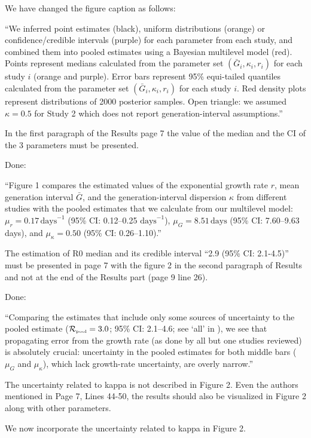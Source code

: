 \documentclass[12pt]{article}
\newcommand{\Rpool}{\ensuremath{{\mathcal R}_{\textrm{\tiny{pool}}}}\xspace}
\newcommand{\revtext}{\textsf}
\begin{document}
We have changed the figure caption as follows:

``We inferred point estimates (black), uniform distributions (orange) or confidence/credible intervals (purple) for each parameter from each study, and combined them into pooled estimates using a Bayesian multilevel model (red).
Points represent medians calculated from the parameter set $(\bar{G}_{i}, \kappa_{i}, r_{i})$ for each study $i$ (orange and purple).
Error bars represent 95\% equi-tailed quantiles calculated from the parameter set $(\bar{G}_{i}, \kappa_{i}, r_{i})$ for each study $i$.
Red density plots represent distributions of 2000 posterior samples.
Open triangle: we assumed $\kappa=0.5$ for Study 2 which does not report generation-interval assumptions.''

\revtext{In the first paragraph of the Results page 7 the value of the median and the CI of the 3
parameters must be presented.}

Done:

``Figure 1 compares the estimated values of the exponential growth rate $r$, mean generation interval $\bar G$, and the generation-interval dispersion $\kappa$ from different studies with the pooled estimates that we calculate from our multilevel model:
$\mu_r = 0.17\,\textrm{days}^{-1}$ (95\% CI: 0.12--0.25 $\textrm{days}^{-1}$),
$\mu_G = 8.51\,\textrm{days}$ (95\% CI: 7.60--9.63 days),
and
$\mu_\kappa = 0.50$ (95\% CI: 0.26--1.10).''

\revtext{The estimation of R0 median and its credible interval “2.9 (95\% CI: 2.1-4.5)” must be presented
in page 7 with the figure 2 in the second paragraph of Results and not at the end of the Results
part (page 9 line 26).}

Done:

``Comparing the estimates that include only some sources of uncertainty to the pooled estimate ($\Rpool = 3.0$; 95\% CI: 2.1--4.6; see `all' in ), we see that propagating error from the growth rate (as done by all but one studies reviewed) is absolutely crucial: uncertainty in the pooled estimates for both middle bars ($\mu_G$ and $\mu_\kappa$), which lack growth-rate uncertainty, are overly narrow.''

\revtext{The uncertainty related to kappa is not described in Figure 2. Even the authors mentioned in
Page 7, Lines 44-50, the results should also be visualized in Figure 2 along with other
parameters.}

We now incorporate the uncertainty related to kappa in Figure 2.
\end{document}
